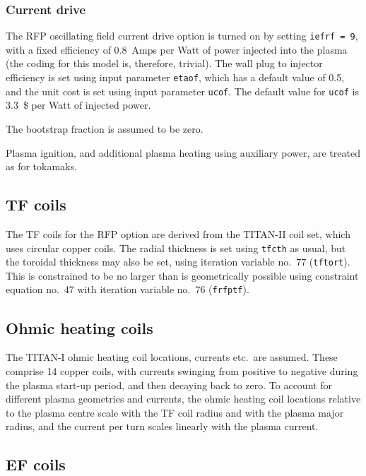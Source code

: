 \documentclass[11pt,a4paper]{report}
\begin{document}
\subsubsection{Current drive}
\label{sec:rfpcd}

The RFP oscillating field current drive option is turned on by setting
\texttt{iefrf = 9}, with a fixed efficiency of 0.8~Amps per Watt of power
injected into the plasma (the coding for this model is, therefore,
trivial). The wall plug to injector efficiency is set using input parameter
\texttt{etaof}, which has a default value of 0.5, and the unit cost is set
using input parameter \texttt{ucof}. The default value for \texttt{ucof} is
3.3~\$ per Watt of injected power.

The bootstrap fraction is assumed to be zero.

Plasma ignition, and additional plasma heating using auxiliary power, are
treated as for tokamaks.

\subsection{TF coils}

The TF coils for the RFP option are derived from the TITAN-II coil set, which
uses circular copper coils. The radial thickness is set using \texttt{tfcth}
as usual, but the toroidal thickness may also be set, using iteration variable
no.\ 77 (\texttt{tftort}). This is constrained to be no larger than is
geometrically possible using constraint equation no.\ 47 with iteration
variable no.\ 76 (\texttt{frfptf}).

\subsection{Ohmic heating coils}

The TITAN-I ohmic heating coil locations, currents etc.\ are assumed. These
comprise 14 copper coils, with currents swinging from positive to negative
during the plasma start-up period, and then decaying back to zero. To account
for different plasma geometries and currents, the ohmic heating coil locations
relative to the plasma centre scale with the TF coil radius and with the
plasma major radius, and the current per turn scales linearly with the plasma
current.

\subsection{EF coils}
\end{document}
